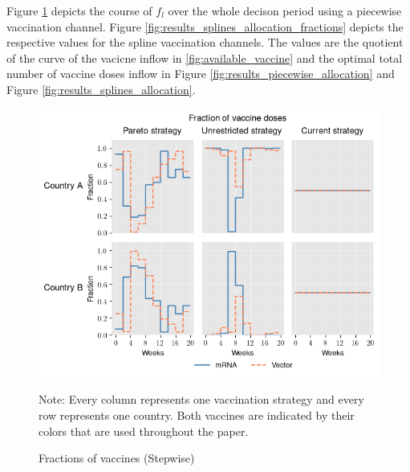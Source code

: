 Figure \ref{fig:results_piecewise_allocation_fractions} depicts the course of $f_l$ over the whole decison period using a piecewise vaccination channel. Figure \ref{fig:results_splines_allocation_fractions} depicts the respective values for the spline vaccination channels. The values are the quotient of the curve of the vacicne inflow in \ref{fig:available_vaccine} and the optimal total number of vaccine doses inflow in Figure \ref{fig:results_piecewise_allocation} and Figure \ref{fig:results_splines_allocation}.
\begin{figure}[h!]
\centering
\includegraphics[scale=0.85]{images/piecewise_vaccine_fractions.png}\\
\begin{flushleft}
\scriptsize{Note:} Every column represents one vaccination strategy and every row represents one country. Both vaccines are indicated by their colors that are used throughout the paper. 
\end{flushleft}
\caption{Fractions of vaccines (Stepwise)}
\label{fig:results_piecewise_allocation_fractions}
\end{figure}

